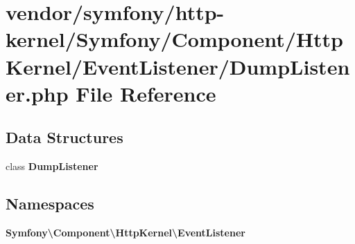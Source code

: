 \section{vendor/symfony/http-\/kernel/\+Symfony/\+Component/\+Http\+Kernel/\+Event\+Listener/\+Dump\+Listener.php File Reference}
\label{_dump_listener_8php}
\subsection*{Data Structures}
\begin{DoxyCompactItemize}
\item 
class {\bf Dump\+Listener}
\end{DoxyCompactItemize}
\subsection*{Namespaces}
\begin{DoxyCompactItemize}
\item 
 {\bf Symfony\textbackslash{}\+Component\textbackslash{}\+Http\+Kernel\textbackslash{}\+Event\+Listener}
\end{DoxyCompactItemize}
